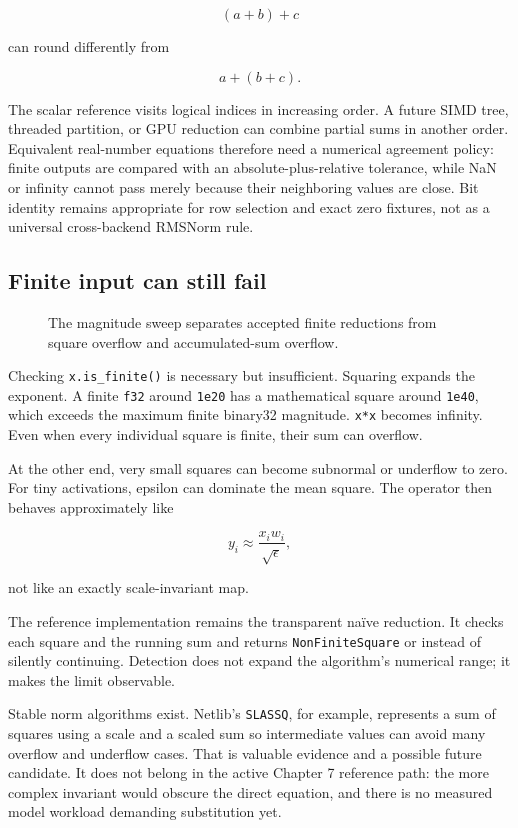 \documentclass[
  10pt,
]{article}
\begin{document}
\[
(a+b)+c
\]

can round differently from

\[
a+(b+c).
\]

The scalar reference visits logical indices in increasing order. A
future SIMD tree, threaded partition, or GPU reduction can combine
partial sums in another order. Equivalent real-number equations
therefore need a numerical agreement policy: finite outputs are compared
with an absolute-plus-relative tolerance, while NaN or infinity cannot
pass merely because their neighboring values are close. Bit identity
remains appropriate for row selection and exact zero fixtures, not as a
universal cross-backend RMSNorm rule.

\subsection{Finite input can still
fail}\label{finite-input-can-still-fail}

\begin{figure}[H]\centering\resizebox{\linewidth}{!}{}\caption{The magnitude sweep separates accepted finite reductions from square overflow and accumulated-sum overflow.}\end{figure}

Checking \texttt{x.is\_finite()} is necessary but insufficient. Squaring
expands the exponent. A finite \texttt{f32} around \texttt{1e20} has a
mathematical square around \texttt{1e40}, which exceeds the maximum
finite binary32 magnitude. \texttt{x*x} becomes infinity. Even when
every individual square is finite, their sum can overflow.

At the other end, very small squares can become subnormal or underflow
to zero. For tiny activations, epsilon can dominate the mean square. The
operator then behaves approximately like

\[
y_i\approx\frac{x_iw_i}{\sqrt{\epsilon}},
\]

not like an exactly scale-invariant map.

The reference implementation remains the transparent naïve reduction. It
checks each square and the running sum and returns
\texttt{NonFiniteSquare} or \texttt{}
instead of silently continuing. Detection does not expand the
algorithm's numerical range; it makes the limit observable.

Stable norm algorithms exist. Netlib's \texttt{SLASSQ}, for example,
represents a sum of squares using a scale and a scaled sum so
intermediate values can avoid many overflow and underflow cases. That is
valuable evidence and a possible future candidate. It does not belong in
the active Chapter 7 reference path: the more complex invariant would
obscure the direct equation, and there is no measured model workload
demanding substitution yet.
\end{document}
